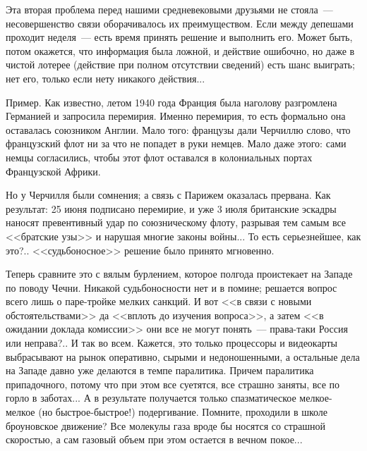 \documentclass{scrbook}
\newcommand{\flqq}{<<}
\newcommand{\frqq}{>>}
\newcommand{\mdash}{~--- }
\begin{document}
Эта вторая проблема перед нашими средневековыми друзьями не стояла{\mdash}несовершенство связи оборачивалось их преимуществом. Если между депешами проходит неделя{\mdash}есть время принять решение и выполнить его. Может быть, потом окажется, что информация была ложной, и действие ошибочно, но даже в чистой лотерее (действие при полном отсутствии сведений) есть шанс выиграть; нет его, только если нету никакого действия...

Пример. Как известно, летом 1940 года Франция была наголову разгромлена Германией и запросила перемирия. Именно перемирия, то есть формально она оставалась союзником Англии. Мало того: французы дали Черчиллю слово, что французский флот ни за что не попадет в руки немцев. Мало даже этого: сами немцы согласились, чтобы этот флот оставался в колониальных портах Французской Африки.

Но у Черчилля были сомнения; а связь с Парижем оказалась прервана. Как результат: 25 июня подписано перемирие, и уже 3 июля британские эскадры наносят превентивный удар по союзническому флоту, разрывая тем самым все {\flqq}братские узы{\frqq} и нарушая многие законы войны... То есть серьезнейшее, как это?.. {\flqq}судьбоносное{\frqq} решение было принято мгновенно.

Теперь сравните это с вялым бурлением, которое полгода проистекает на Западе по поводу Чечни. Никакой судьбоносности нет и в помине; решается вопрос всего лишь о паре-тройке мелких санкций. И вот {\flqq}в связи с новыми обстоятельствами{\frqq} да {\flqq}вплоть до изучения вопроса{\frqq}, а затем {\flqq}в ожидании доклада комиссии{\frqq} они все не могут понять{\mdash}права-таки Россия или неправа?.. И так во всем. Кажется, это только процессоры и видеокарты выбрасывают на рынок оперативно, сырыми и недоношенными, а остальные дела на Западе давно уже делаются в темпе паралитика. Причем паралитика припадочного, потому что при этом все суетятся, все страшно заняты, все по горло в заботах... А в результате получается только спазматическое мелкое-мелкое (но быстрое-быстрое!) подергивание. Помните, проходили в школе броуновское движение? Все молекулы газа вроде бы носятся со страшной скоростью, а сам газовый объем при этом остается в вечном покое...
\end{document}
